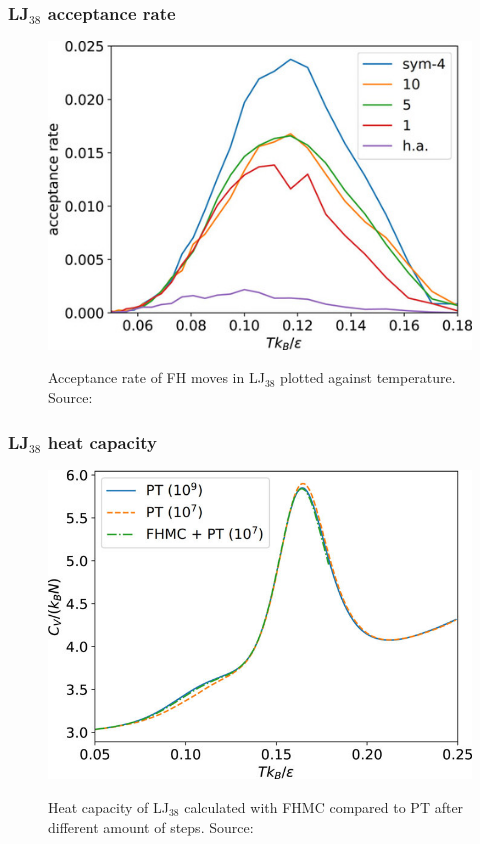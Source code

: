 \documentclass{beamer}
\begin{document}
	\begin{frame}
		\frametitle{LJ$_{38}$ acceptance rate}
		\begin{figure}
			\center
			\includegraphics[height=0.8\textheight]{figures/LJ38_acc.jpg}
			\label{fig:LJ38_acc}
			\caption{Acceptance rate  of FH moves in LJ$_{38}$ plotted against temperature. Source: \cite{Finkler2020}}
		\end{figure}
	\end{frame}

	\begin{frame}
		\frametitle{LJ$_{38}$ heat capacity}
		\begin{figure}
			\center
			\includegraphics[height=0.8\textheight]{figures/LJ38_Cv.jpeg}
			\label{fig:LJ38_Cv}
			\caption{Heat capacity of LJ$_{38}$ calculated with FHMC compared to PT after different amount of steps. Source: \cite{Finkler2020}}
		\end{figure}		
	\end{frame}
\end{document}

